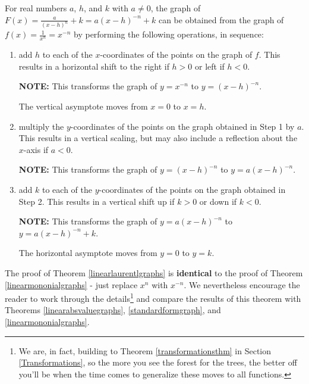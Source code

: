\documentclass{ximera}
\begin{document}
\begin{theorem} \label{linearlaurentlgraphs}  For real numbers $a$, $h$, and $k$ with $a \neq 0$, the graph of $F(x) = \frac{a}{(x-h)^n}+k =  a(x-h)^{-n}+k$  can be obtained from the graph of $f(x) = \frac{1}{x^n}= x^{-n}$ by performing the following operations, in sequence:

\begin{enumerate}

\item  add $h$ to each of the $x$-coordinates of the points on the graph of $f$.  This results in a horizontal shift to the right if $h > 0$ or left if $h < 0$.

\textbf{NOTE:}  This transforms the graph of $y = x^{-n}$ to $y = (x-h)^{-n}$.   

The vertical asymptote moves from $x=0$ to $x=h$.

\item  multiply the $y$-coordinates of the points on the graph obtained in Step 1 by $a$.   This results in a vertical scaling, but may also include a reflection about the $x$-axis if $a < 0$.

\textbf{NOTE:}  This transforms the graph of $y = (x-h)^{-n}$ to $y = a(x-h)^{-n}$.

\item  add $k$ to each of the $y$-coordinates of the points on the graph obtained in Step 2.  This results in a vertical shift up if $k > 0$ or down if $k< 0$.

\textbf{NOTE:}  This transforms the graph of  $y = a(x-h)^{-n}$ to $y = a(x-h)^{-n}+k$.

The  horizontal asymptote moves from $y=0$ to $y=k$.

\end{enumerate}

\end{theorem}



The proof of Theorem \ref{linearlaurentlgraphs} is \textbf{identical} to the proof of Theorem \ref{linearmononialgraphs} - just replace $x^n$ with $x^{-n}$.  We nevertheless encourage the reader to work through the details\footnote{We are, in fact, building to Theorem \ref{transformationsthm} in Section \ref{Transformations}, so the more you see the forest for the trees, the better off you'll be when the time comes to generalize these moves to all functions.} and compare the results of this theorem with Theorems \ref{linearabsvaluegraphs}, \ref{standardformgraph}, and  \ref{linearmononialgraphs}.
\end{document}

